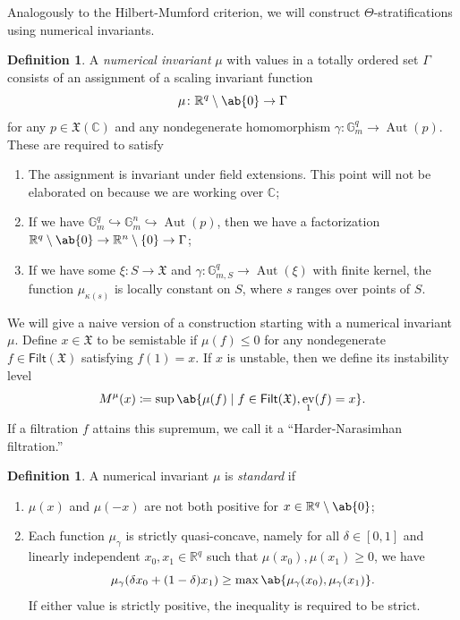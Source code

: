\documentclass{amsart}
\theoremstyle{definition}
\newtheorem{defn}[thm]{Definition}
\theoremstyle{remark}
\theoremstyle{plain}
\theoremstyle{definition}
\theoremstyle{remark}
\newcommand{\G}{\mathbb{G}}
\newcommand{\R}{\mathbb{R}}
\newcommand{\C}{\mathbb{C}}
\newcommand{\mf}[1]{\mathfrak{#1}}
\newcommand{\ms}[1]{\mathsf{#1}}
\newcommand{\1}{\mathbf{1}}
\newcommand{\2}{\mathbf{2}}
\newcommand{\3}{\mathbf{3}}
\DeclareMathOperator{\Aut}{Aut}
\DeclareMathOperator{\ev}{ev}
\begin{document}
Analogously to the Hilbert-Mumford criterion, we will construct \(\Theta\)-stratifications using numerical invariants.
\begin{defn}
    A \textit{numerical invariant} \(\mu\) with values in a totally ordered set \(\Gamma\) consists of an assignment of a scaling invariant function
    \[ \mu \colon \R^q \setminus \ab\{0\} \to \Gamma \]
    for any \(p \in \mf{X}(\C)\) and any nondegenerate homomorphism \(\gamma \colon \G_m^q \to \Aut(p)\). These are required to satisfy
    \begin{enumerate}
        \item The assignment is invariant under field extensions. This point will not be elaborated on because we are working over \(\C\);
        \item If we have \(\G_m^q \hookrightarrow \G_m^n \hookrightarrow \Aut(p)\), then we have a factorization \(\R^q \setminus \ab\{0\} \to \R^n \setminus \{0\} \to \Gamma\);
        \item If we have some \(\xi \colon S \to \mf{X}\) and \(\gamma \colon \G_{m, S}^q \to \Aut(\xi)\) with finite kernel, the function \(\mu_{\kappa(s)}\) is locally constant on \(S\), where \(s\) ranges over points of \(S\).
    \end{enumerate}
\end{defn}

We will give a naive version of a construction starting with a numerical invariant \(\mu\). Define \(x \in \mf{X}\) to be semistable if \(\mu(f) \leq 0\) for any nondegenerate \(f \in \ms{Filt}(\mf{X})\) satisfying \(f(1) = x\). If \(x\) is unstable, then we define its instability level
\[ M^{\mu}(x) \coloneqq \sup \ab\{ \mu(f) \mid f \in \ms{Filt}(\mf{X}), \ev_1(f) = x\}. \]
If a filtration \(f\) attains this supremum, we call it a ``Harder-Narasimhan filtration.''

\begin{defn}
    A numerical invariant \(\mu\) is \textit{standard} if
    \begin{enumerate}
        \item \(\mu(x)\) and \(\mu(-x)\) are not both positive for \(x \in \R^q \setminus \ab\{0\}\);
        \item Each function \(\mu_{\gamma}\) is strictly quasi-concave, namely for all \(\delta \in [0,1]\) and linearly independent \(x_0, x_1 \in \R^q\) such that \(\mu(x_0), \mu(x_1) \geq 0\), we have
            \[\mu_{\gamma}(\delta x_0 + (1-\delta)x_1) \geq \max\ab\{\mu_{\gamma}(x_0), \mu_{\gamma}(x_1)\}.\] If either value is strictly positive, the inequality is required to be strict.
    \end{enumerate}
\end{defn}
\end{document}

